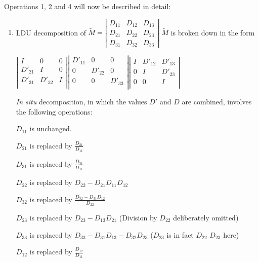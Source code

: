 Operations 1, 2 and 4 will now be described in detail:

\begin{enumerate}


  \item LDU decomposition of $\tilde{M}=\left|
    \begin{array}{ccc}
      {D_{11} } & {D_{12}} & {D_{13} } \\
      {D_{21} } & {D_{22} } & {D_{23} } \\
      {D_{31} } & {D_{32} } & {D_{33} }
    \end{array}\right|$
  $ \tilde{M}$ is broken down in the form

  $\left|\begin{array}{ccc}
    I & 0 & 0 \\
    D'_{21} & I & 0 \\
    D'_{31} & D'_{32} & I \\
   \end{array}\right|
   \left|\begin{array}{ccc}
     D'_{11} & 0 & 0 \\
     0 & D'_{22} & 0 \\
     0 & 0 & D'_{33} \\
   \end{array}\right|
   \left|\begin{array}{ccc}
     I & D'_{12} & D'_{13} \\
     0 & I & D'_{23} \\
     0 & 0 & I \\
   \end{array}\right|$

\textit{In situ} decomposition, in which the values $D'$ and $D$ are combined,
involves the following operations:

$D_{11}$ is unchanged.

$D_{21}$ is replaced by $\frac{D_{21}}{D_{11}}$

$D_{31}$ is replaced by $\frac{D_{31}}{D_{11}}$

$D_{22}$ is replaced by $D_{22}- D_{21}D_{11}D_{12}$

$D_{32}$ is replaced by $\frac{D_{32}-D_{31}D_{12}}{D_{22}}$

$D_{23}$ is replaced by $D_{23} - D_{13}D_{21}$ (Division by $D_{22}$
deliberately omitted)

$D_{33}$ is replaced by $D_{33} - D_{31}D_{13} - D_{32}D_{23}$  ($D_{23}$ is in
fact $D_{22}$ $D_{23}$ here)

$D_{12}$ is replaced by $\frac{D_{12}}{D_{11}}$


\end{enumerate}
